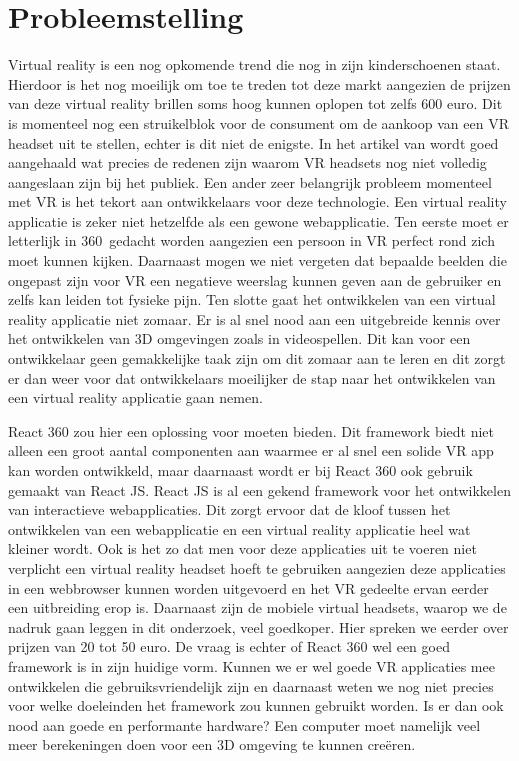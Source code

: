 \section{Probleemstelling}
\label{sec:probleemstelling}

Virtual reality is een nog opkomende trend die nog in zijn kinderschoenen staat. Hierdoor is het nog moeilijk om toe te treden tot deze markt aangezien de prijzen van deze virtual reality brillen soms hoog kunnen oplopen tot zelfs 600 euro. Dit is momenteel nog een struikelblok voor de consument om de aankoop van een VR  headset uit te stellen, echter is dit niet de enigste. In het artikel van \autocite{Abarrera2017} wordt goed aangehaald wat precies de redenen zijn waarom VR headsets nog niet volledig aangeslaan zijn bij het publiek. Een ander zeer belangrijk probleem momenteel met VR is het tekort aan ontwikkelaars voor deze technologie. Een virtual reality applicatie is zeker niet hetzelfde als een gewone webapplicatie. Ten eerste moet er letterlijk in 360\textdegree\  gedacht worden aangezien een persoon in VR perfect rond zich moet kunnen kijken. Daarnaast mogen we niet vergeten dat bepaalde beelden die ongepast zijn voor VR een negatieve weerslag kunnen geven aan de gebruiker en zelfs kan leiden tot fysieke pijn. Ten slotte gaat het ontwikkelen van een virtual reality applicatie niet zomaar. Er is al snel nood aan een uitgebreide kennis over het ontwikkelen van 3D omgevingen zoals in videospellen. Dit kan voor een ontwikkelaar geen gemakkelijke taak zijn om dit zomaar aan te leren en dit zorgt er dan weer voor dat ontwikkelaars moeilijker de stap naar het ontwikkelen van een virtual reality applicatie gaan nemen.

React 360 zou hier een oplossing voor moeten bieden. Dit framework biedt niet alleen een groot aantal componenten aan waarmee er al snel een solide VR app kan worden ontwikkeld, maar daarnaast wordt er bij React 360 ook gebruik gemaakt van React JS. React JS is al een gekend framework voor het ontwikkelen van interactieve webapplicaties. Dit zorgt ervoor dat de kloof tussen het ontwikkelen van een webapplicatie en een virtual reality applicatie heel wat kleiner wordt. Ook is het zo dat men voor deze applicaties uit te voeren niet verplicht een virtual reality headset hoeft te gebruiken aangezien deze applicaties in een webbrowser kunnen worden uitgevoerd en het VR gedeelte ervan eerder een uitbreiding erop is. Daarnaast zijn de mobiele virtual headsets, waarop we de nadruk gaan leggen in dit onderzoek, veel goedkoper. Hier spreken we eerder over prijzen van 20 tot 50 euro. De vraag is echter of React 360 wel een goed framework is in zijn huidige vorm. Kunnen we er wel goede VR applicaties mee ontwikkelen die gebruiksvriendelijk zijn en daarnaast weten we nog niet precies voor welke doeleinden het framework zou kunnen gebruikt worden. Is er dan ook nood aan goede en performante hardware? Een computer moet namelijk veel meer berekeningen doen voor een 3D omgeving te kunnen creëren.


